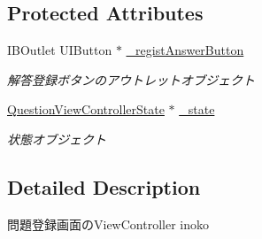\subsection*{Protected Attributes}
\begin{DoxyCompactItemize}
\item 
\hypertarget{interface_question_regist_view_controller_a2fe809dd2e719ac628a44dc86e834fa1}{
IBOutlet UIButton $\ast$ \hyperlink{interface_question_regist_view_controller_a2fe809dd2e719ac628a44dc86e834fa1}{\_\-registAnswerButton}}
\label{interface_question_regist_view_controller_a2fe809dd2e719ac628a44dc86e834fa1}

\begin{DoxyCompactList}\small\item\em 解答登録ボタンのアウトレットオブジェクト \end{DoxyCompactList}\item 
\hypertarget{interface_question_regist_view_controller_ad023a868e7e6e999c490ebe805ab6ed6}{
\hyperlink{interface_question_view_controller_state}{QuestionViewControllerState} $\ast$ \hyperlink{interface_question_regist_view_controller_ad023a868e7e6e999c490ebe805ab6ed6}{\_\-state}}
\label{interface_question_regist_view_controller_ad023a868e7e6e999c490ebe805ab6ed6}

\begin{DoxyCompactList}\small\item\em 状態オブジェクト \end{DoxyCompactList}\end{DoxyCompactItemize}


\subsection{Detailed Description}
問題登録画面のViewController  inoko 

